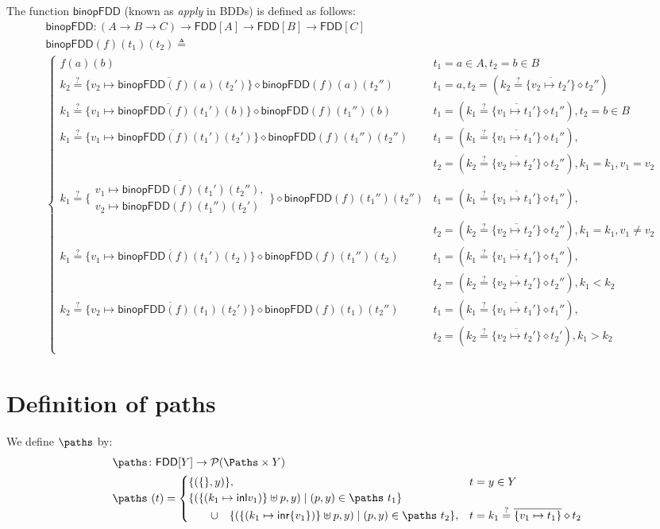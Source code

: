 \documentclass[acmsmall,dvipsnames,nonacm]{acmart}
\newcommand\binopFDD{\mathsf{binopFDD}}
\newcommand\FDD{\textsf{FDD}}
\newcommand{\fddn}[4]{#1 \stackrel ? = \overline{\{ #2\mapsto #3\}} \diamond #4}
\begin{document}
The function $\binopFDD$ (known as \emph{apply} in BDDs) is defined as follows:
\begin{align*}
&\binopFDD\colon (A\to B\to C)\to \FDD[A] \to \FDD[B] \to \FDD[C] \\
&\binopFDD (f) (t_1) (t_2) \triangleq \\ &\begin{cases}
        f (a) (b)  & t_1 = a \in A, t_2 = b\in B\\
       \fddn{k_2}{v_2}{\binopFDD(f)(a)(t_2')}{\binopFDD(f)(a)(t_2'')}
                     & t_1 = a, t_2 = (\fddn{k_2}{v_2}{t_2'}{t_2''}) \\
       \fddn{k_1}{v_1}{\binopFDD(f)(t_1')(b)}{\binopFDD(f)(t_1'')(b)}
                     & t_1 = (\fddn{k_1}{v_1}{t_1'}{t_1''}), t_2 = b\in B \\
       \fddn{k_1}{v_1}{\binopFDD(f)(t_1')(t_2')}{\binopFDD(f)(t_1'')(t_2'')}
       & t_1 = (\fddn{k_1}{v_1}{t_1'}{t_1''}),\\
       & t_2 = (\fddn{k_2}{v_2}{t_2'}{t_2''}), k_1=k_1, v_1=v_2 \\
       {k_1 \stackrel ? = \overline{\{
           \substack
           {v_1\mapsto \binopFDD(f)(t_1')(t_2''),\\
            v_2\mapsto \binopFDD(f)(t_1'')(t_2')} \}} \diamond
       \binopFDD (f)(t_1'')(t_2'')}
       & t_1 = (\fddn{k_1}{v_1}{t_1'}{t_1''}),\\
       & t_2 = (\fddn{k_2}{v_2}{t_2'}{t_2''}), k_1=k_1, v_1\neq v_2 \\
       \fddn{k_1}{v_1}{\binopFDD(f)(t_1')(t_2)}{\binopFDD(f)(t_1'')(t_2)}& t_1 = (\fddn{k_1}{v_1}{t_1'}{t_1''}),\\
                     &  t_2 = (\fddn{k_2}{v_2}{t_2'}{t_2''}), k_1<k_2\\
       \fddn{k_2}{v_2}{\binopFDD(f)(t_1)(t_2')}{\binopFDD(f)(t_1)(t_2'')}& t_1 = (\fddn{k_1}{v_1}{t_1'}{t_1''}),\\
                     & t_2 = (\fddn{k_2}{v_2}{t_2'}{t_2'}), k_1>k_2\\
    \end{cases}
\end{align*}

\section{Definition of paths}\label{ap:paths}
We define $\paths$ by:
\begin{align*}
    &\paths\colon \FDD[Y] \to \mathcal{P}(\Paths \times Y) \\
    &\paths\ (t) = \begin{cases}
        \{(\{\}, y)\}, & t = y\in Y\\
        \{(\{(k_1 \mapsto \mathsf{inl } v_1)\}\uplus p, y) \mid (p,y)\in\paths\ t_1\}\\
        \qquad \cup\quad \{(\{(k_1 \mapsto \mathsf{inr } \{v_1\})\}\uplus p, y) \mid
        (p,y)\in\paths\ t_2 \},& t=\fddn{k_1}{v_1}{t_1}{t_2}
    \end{cases}
\end{align*}
\end{document}
